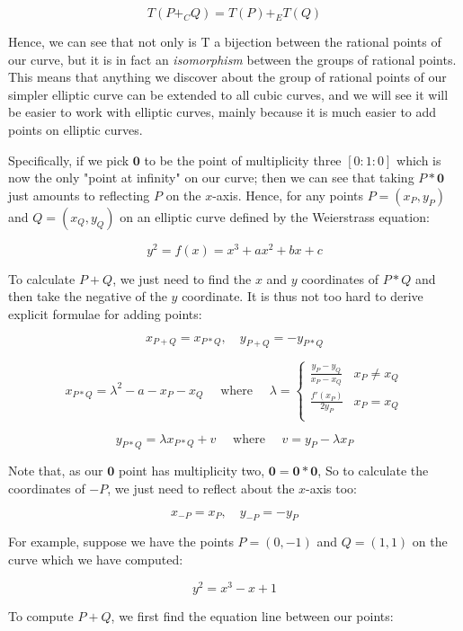 \documentclass{article}
\begin{document}
\[T(P +_C Q) = T(P) +_E T(Q)\]

Hence, we can see that not only is T a bijection between the rational points of our curve, but it is in fact an \emph{isomorphism} between the groups of rational points. This means that anything we discover about the group of rational points of our simpler elliptic curve can be extended to all cubic curves, and we will see it will be easier to work with elliptic curves, mainly because it is much easier to add points on elliptic curves.

Specifically, if we pick $\mathbf{0}$ to be the point of multiplicity three $[0 : 1 :0]$ which is now the only "point at infinity" on our curve; then we can see that taking $P * \mathbf{0}$ just amounts to reflecting $P$ on the $x$-axis. Hence, for any points $P = (x_P, y_P)$ and $Q = (x_Q, y_Q)$ on an elliptic curve defined by the Weierstrass equation:

\[y^2 = f(x) = x^3 + ax^2 + bx + c\]

To calculate $P + Q$, we just need to find the $x$ and $y$ coordinates of $P * Q$ and then take the negative of the $y$ coordinate. It is thus not too hard to derive explicit formulae for adding points:

\[x_{P+Q} = x_{P*Q}, \quad y_{P+Q} = - y_{P*Q}\]

\[x_{P*Q} = \lambda^2 - a - x_P - x_Q \quad \text{ where } \quad \lambda = \begin{cases} 
          \frac{y_P - y_Q}{x_P - x_Q} & x_P \neq x_Q \\
          \frac{f'(x_P)}{2y_P} & x_P = x_Q \\
       \end{cases}\]
       
\[y_{P*Q} = \lambda x_{P*Q} + v \quad \text{ where } \quad v = y_P - \lambda x_P\]

Note that, as our $\mathbf{0}$ point has multiplicity two, $\mathbf{0} = \mathbf{0} * \mathbf{0}$, So to calculate the coordinates of $-P$, we just need to reflect about the $x$-axis too:

\[x_{-P} = x_P, \quad y_{-P} = -y_P\]

For example, suppose we have the points $P = (0, -1)$ and $Q = (1, 1)$ on the curve which we have computed:

\[y^{2} = x^{3} - x  + 1\]

To compute $P + Q$, we first find the equation line between our points:
\end{document}
